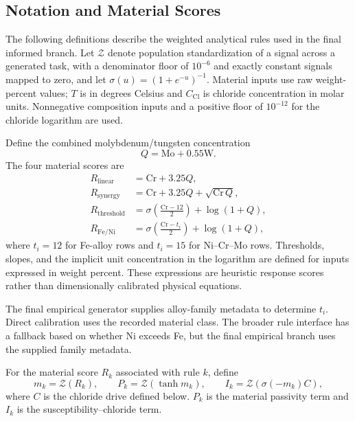 \documentclass{article}
\begin{document}
\subsection{Notation and Material Scores}

The following definitions describe the weighted analytical rules used in the
final informed branch. Let \(\mathcal{Z}\) denote population standardization
of a signal across a generated task, with a denominator floor of \(10^{-6}\)
and exactly constant signals mapped to zero, and let
\(\sigma(u)=(1+e^{-u})^{-1}\). Material inputs use raw
weight-percent values; \(T\) is in degrees Celsius and \(C_{\mathrm{Cl}}\)
is chloride concentration in molar units. Nonnegative composition inputs and
a positive floor of \(10^{-12}\) for the chloride logarithm are used.

Define the combined molybdenum/tungsten concentration
\[
Q=\mathrm{Mo}+0.55\mathrm{W}.
\]
The four material scores are
\begin{align}
R_{\mathrm{linear}}
    &=\mathrm{Cr}+3.25Q,\label{eq:rule-linear}\\
R_{\mathrm{synergy}}
    &=\mathrm{Cr}+3.25Q+\sqrt{\mathrm{Cr}\,Q},\label{eq:rule-synergy}\\
R_{\mathrm{threshold}}
    &=\sigma\!\left(\frac{\mathrm{Cr}-12}{2}\right)
      +\log(1+Q),\label{eq:rule-threshold}\\
R_{\mathrm{Fe/Ni}}
    &=\sigma\!\left(\frac{\mathrm{Cr}-t_i}{2}\right)
      +\log(1+Q),\label{eq:rule-fe-ni}
\end{align}
where \(t_i=12\) for Fe-alloy rows and \(t_i=15\) for Ni--Cr--Mo rows.
Thresholds, slopes, and the implicit unit concentration in the logarithm are
defined for inputs expressed in weight percent. These expressions are
heuristic response scores rather than dimensionally calibrated physical
equations.

The final empirical generator supplies alloy-family metadata to determine
\(t_i\). Direct calibration uses the recorded material class. The broader
rule interface has a fallback based on whether Ni exceeds Fe, but the final
empirical branch uses the supplied family metadata.

For the material score \(R_k\) associated with rule \(k\), define
\begin{equation}
m_k=\mathcal{Z}(R_k),\qquad
P_k=\mathcal{Z}(\tanh m_k),\qquad
I_k=\mathcal{Z}\!\left(\sigma(-m_k)C\right),
\label{eq:rule-material-signals}
\end{equation}
where \(C\) is the chloride drive defined below. \(P_k\) is the material
passivity term and \(I_k\) is the susceptibility--chloride term.
\end{document}

